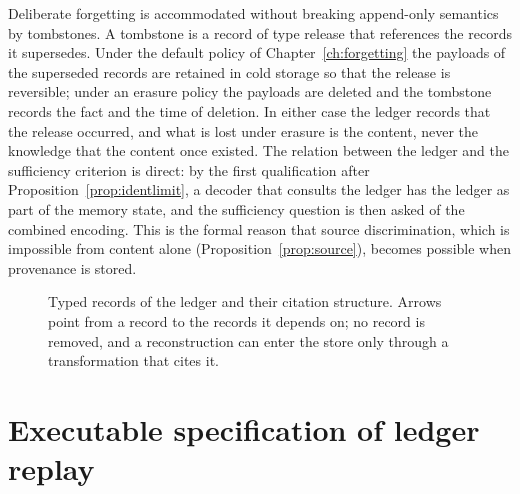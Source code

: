 Deliberate forgetting is accommodated without breaking append-only semantics by tombstones. A tombstone is a record of type release that references the records it supersedes. Under the default policy of Chapter~\ref{ch:forgetting} the payloads of the superseded records are retained in cold storage so that the release is reversible; under an erasure policy the payloads are deleted and the tombstone records the fact and the time of deletion. In either case the ledger records that the release occurred, and what is lost under erasure is the content, never the knowledge that the content once existed. The relation between the ledger and the sufficiency criterion is direct: by the first qualification after Proposition~\ref{prop:identlimit}, a decoder that consults the ledger has the ledger as part of the memory state, and the sufficiency question is then asked of the combined encoding. This is the formal reason that source discrimination, which is impossible from content alone (Proposition~\ref{prop:source}), becomes possible when provenance is stored.


\begin{figure}[t]
\centering
{}
\caption{Typed records of the ledger and their citation structure. Arrows point from a record to the records it depends on; no record is removed, and a reconstruction can enter the store only through a transformation that cites it.}\label{fig:ledger}
\end{figure}

\section*{Executable specification of ledger replay}\label{sec:replaycode}

